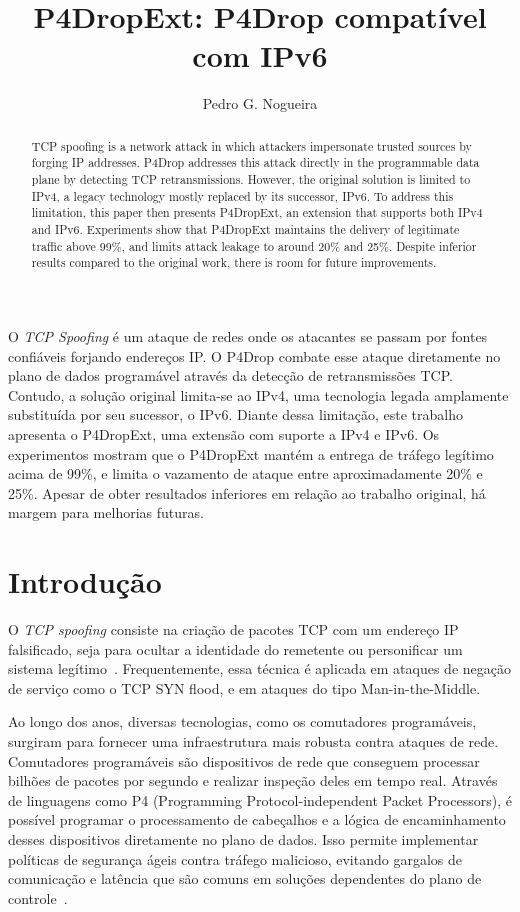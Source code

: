 \documentclass[12pt]{article}
\title{P4DropExt: P4Drop compatível com IPv6}
\author{Pedro G. Nogueira\inst{1}}
\begin{document}
\maketitle

\begin{abstract}
  TCP spoofing is a network attack in which attackers impersonate trusted sources by forging IP addresses.
  P4Drop addresses this attack directly in the programmable data plane by detecting TCP retransmissions.
  However, the original solution is limited to IPv4, a legacy technology mostly replaced by its successor, IPv6.
  To address this limitation, this paper then presents P4DropExt, an extension that supports both IPv4 and IPv6.
  Experiments show that P4DropExt maintains the delivery of legitimate traffic above 99\%,
  and limits attack leakage to around 20\% and 25\%.
  Despite inferior results compared to the original work, there is room for future improvements.
\end{abstract}

\begin{resumo}
  O \textit{TCP Spoofing} é um ataque de redes onde os atacantes se passam por fontes confiáveis forjando endereços IP.
  O P4Drop combate esse ataque diretamente no plano de dados programável através da detecção de retransmissões TCP.
  Contudo, a solução original limita-se ao IPv4, uma tecnologia legada amplamente substituída por seu sucessor, o IPv6.
  Diante dessa limitação, este trabalho apresenta o P4DropExt, uma extensão com suporte a IPv4 e IPv6.
  Os experimentos mostram que o P4DropExt mantém a entrega de tráfego legítimo acima de 99\%,
  e limita o vazamento de ataque entre aproximadamente 20\% e 25\%.
  Apesar de obter resultados inferiores em relação ao trabalho original, há margem para melhorias futuras.
\end{resumo}


\section{Introdução}

O \textit{TCP spoofing} consiste na criação de pacotes TCP com um endereço IP falsificado,
seja para ocultar a identidade do remetente ou personificar um sistema legítimo~\cite{wiki:ip_spoofing}.
Frequentemente, essa técnica é aplicada em ataques de negação de serviço como o TCP SYN flood,
e em ataques do tipo Man-in-the-Middle.

Ao longo dos anos, diversas tecnologias, como os comutadores programáveis,
surgiram para fornecer uma infraestrutura mais robusta contra ataques de rede.
Comutadores programáveis são dispositivos de rede que conseguem processar bilhões de pacotes por segundo e realizar inspeção deles em tempo real.
Através de linguagens como P4 (Programming Protocol-independent Packet Processors),
é possível programar o processamento de cabeçalhos e a lógica de encaminhamento desses dispositivos diretamente no plano de dados.
Isso permite implementar políticas de segurança ágeis contra tráfego malicioso,
evitando gargalos de comunicação e latência que são comuns em soluções dependentes do plano de controle~\cite{p4drop}.
\end{document}
